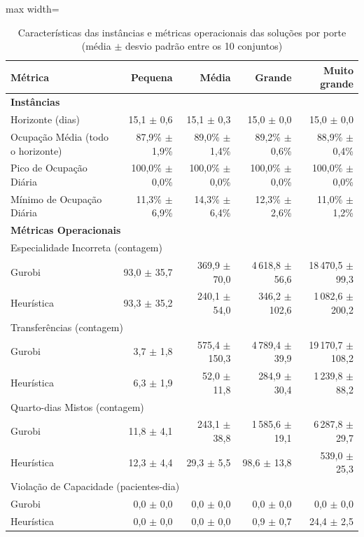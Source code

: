 \begin{table}[htbp]
    \caption{Características das instâncias e métricas operacionais das soluções por porte (média $\pm$ desvio padrão entre os 10 conjuntos)}
    \label{tab:res-operacionais}
    \centering
    \begin{adjustbox}{max width=\textwidth}
    \begin{tabular}{lrrrr}
        \hline
        \textbf{Métrica} & \textbf{Pequena} & \textbf{Média} & \textbf{Grande} & \textbf{Muito grande} \\
        \hline
        \multicolumn{5}{l}{\textbf{Instâncias}} \\
        Horizonte (dias) & 15,1 $\pm$ 0,6 & 15,1 $\pm$ 0,3 & 15,0 $\pm$ 0,0 & 15,0 $\pm$ 0,0 \\
        Ocupação Média (todo o horizonte) & 87,9\% $\pm$ 1,9\% & 89,0\% $\pm$ 1,4\% & 89,2\% $\pm$ 0,6\% & 88,9\% $\pm$ 0,4\% \\
        Pico de Ocupação Diária & 100,0\% $\pm$ 0,0\% & 100,0\% $\pm$ 0,0\% & 100,0\% $\pm$ 0,0\% & 100,0\% $\pm$ 0,0\% \\
        Mínimo de Ocupação Diária & 11,3\% $\pm$ 6,9\% & 14,3\% $\pm$ 6,4\% & 12,3\% $\pm$ 2,6\% & 11,0\% $\pm$ 1,2\% \\
        \hline
        \multicolumn{5}{l}{\textbf{Métricas Operacionais}} \\
        \multicolumn{5}{l}{Especialidade Incorreta (contagem)} \\
        \quad Gurobi & 93,0 $\pm$ 35,7 & 369,9 $\pm$ 70,0 & 4\,618,8 $\pm$ 56,6 & 18\,470,5 $\pm$ 99,3 \\
        \quad Heurística & 93,3 $\pm$ 35,2 & 240,1 $\pm$ 54,0 & 346,2 $\pm$ 102,6 & 1\,082,6 $\pm$ 200,2 \\
        \multicolumn{5}{l}{Transferências (contagem)} \\
        \quad Gurobi & 3,7 $\pm$ 1,8 & 575,4 $\pm$ 150,3 & 4\,789,4 $\pm$ 39,9 & 19\,170,7 $\pm$ 108,2 \\
        \quad Heurística & 6,3 $\pm$ 1,9 & 52,0 $\pm$ 11,8 & 284,9 $\pm$ 30,4 & 1\,239,8 $\pm$ 88,2 \\
        \multicolumn{5}{l}{Quarto-dias Mistos (contagem)} \\
        \quad Gurobi & 11,8 $\pm$ 4,1 & 243,1 $\pm$ 38,8 & 1\,585,6 $\pm$ 19,1 & 6\,287,8 $\pm$ 29,7 \\
        \quad Heurística & 12,3 $\pm$ 4,4 & 29,3 $\pm$ 5,5 & 98,6 $\pm$ 13,8 & 539,0 $\pm$ 25,3 \\
        \multicolumn{5}{l}{Violação de Capacidade (pacientes-dia)} \\
        \quad Gurobi & 0,0 $\pm$ 0,0 & 0,0 $\pm$ 0,0 & 0,0 $\pm$ 0,0 & 0,0 $\pm$ 0,0 \\
        \quad Heurística & 0,0 $\pm$ 0,0 & 0,0 $\pm$ 0,0 & 0,9 $\pm$ 0,7 & 24,4 $\pm$ 2,5 \\
        \hline
    \end{tabular}
    \end{adjustbox}
\end{table}

